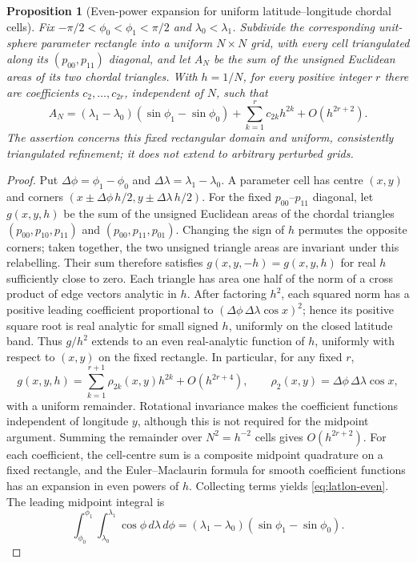 \documentclass[11pt]{article}
\newtheorem{proposition}{Proposition}
\theoremstyle{remark}
\begin{document}
\begin{proposition}[Even-power expansion for uniform latitude--longitude chordal cells]
\label{prop:latlon-even}
Fix $-\pi/2<\phi_0<\phi_1<\pi/2$ and $\lambda_0<\lambda_1$.
Subdivide the corresponding unit-sphere parameter rectangle into a uniform
$N\times N$ grid, with every cell triangulated along its $(p_{00},p_{11})$
diagonal, and let $A_N$ be the sum of the unsigned Euclidean areas of its two
chordal triangles. With $h=1/N$, for every positive integer $r$ there are
coefficients $c_{2},\ldots,c_{2r}$, independent of $N$, such that
\begin{equation}\label{eq:latlon-even}
 A_N=(\lambda_1-\lambda_0)(\sin\phi_1-\sin\phi_0)
       +\sum_{k=1}^{r}c_{2k}h^{2k}+O(h^{2r+2}).
\end{equation}
The assertion concerns this fixed rectangular domain and uniform, consistently
triangulated refinement; it does not extend to arbitrary perturbed grids.
\end{proposition}
\begin{proof}
Put $\Delta\phi=\phi_1-\phi_0$ and $\Delta\lambda=\lambda_1-\lambda_0$.
A parameter cell has centre $(x,y)$ and corners
$(x\pm\Delta\phi\,h/2,y\pm\Delta\lambda\,h/2)$.
For the fixed $p_{00}$--$p_{11}$ diagonal, let $g(x,y,h)$ be the sum of the
unsigned Euclidean areas of the chordal triangles
$(p_{00},p_{10},p_{11})$ and $(p_{00},p_{11},p_{01})$.
Changing the sign of $h$ permutes the opposite corners; taken together, the
two unsigned triangle areas are invariant under this relabelling. Their sum therefore satisfies
$g(x,y,-h)=g(x,y,h)$ for real $h$ sufficiently close to zero.
Each triangle has area one half of the norm of a cross product of edge
vectors analytic in $h$. After factoring $h^2$, each squared norm has a
positive leading coefficient proportional to
$(\Delta\phi\,\Delta\lambda\cos x)^2$; hence its positive square root
is real analytic for small signed $h$, uniformly on the closed latitude band. Thus $g/h^2$ extends to an even real-analytic
function of $h$, uniformly with respect to $(x,y)$ on the fixed rectangle.
In particular, for any fixed $r$,
\[
 g(x,y,h)=\sum_{k=1}^{r+1}\rho_{2k}(x,y)h^{2k}
                +O(h^{2r+4}),\qquad
 \rho_2(x,y)=\Delta\phi\,\Delta\lambda\cos x,
\]
with a uniform remainder. Rotational invariance makes the coefficient
functions independent of longitude $y$, although this is not required for
the midpoint argument.
Summing the remainder over $N^2=h^{-2}$ cells gives
$O(h^{2r+2})$. For each coefficient, the cell-centre sum is a composite
midpoint quadrature on a fixed rectangle, and the Euler--Maclaurin formula
for smooth coefficient functions has an expansion in even powers of $h$.
Collecting terms yields \eqref{eq:latlon-even}. The leading midpoint integral
is
\[
 \int_{\phi_0}^{\phi_1}\int_{\lambda_0}^{\lambda_1}
            \cos\phi\,d\lambda\,d\phi
 = (\lambda_1-\lambda_0)(\sin\phi_1-\sin\phi_0).
\]
\end{proof}
\end{document}

